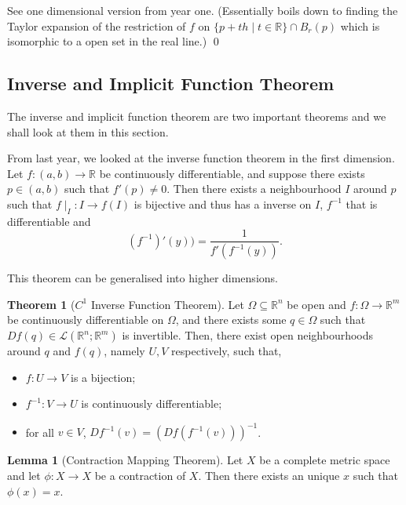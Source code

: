 \documentclass[
]{article}
\theoremstyle{definition}
\newtheorem{theorem}{Theorem}
\theoremstyle{definition}
\newtheorem{lemma}{Lemma}[section]
\begin{document}
See one dimensional version from year one. (Essentially boils down to
finding the Taylor expansion of the restriction of \(f\) on
\(\{p + th \mid t \in \mathbb{R}\} \cap B_r(p)\) which is isomorphic to
a open set in the real line.) \qed

\hypertarget{inverse-and-implicit-function-theorem}{%
\subsection{Inverse and Implicit Function
Theorem}\label{inverse-and-implicit-function-theorem}}

The inverse and implicit function theorem are two important theorems and
we shall look at them in this section.

From last year, we looked at the inverse function theorem in the first
dimension. Let \(f : (a, b) \to \mathbb{R}\) be continuously
differentiable, and suppose there exists \(p \in (a, b)\) such that
\(f'(p) \neq 0\). Then there exists a neighbourhood \(I\) around \(p\)
such that \(f \mid_I : I \to f(I)\) is bijective and thus has a inverse
on \(I\), \(f^{-1}\) that is differentiable and
\[(f^{-1})'(y)) = \frac{1}{f'(f^{-1}(y))}.\]

This theorem can be generalised into higher dimensions.

\begin{theorem}[\(C^1\) Inverse Function Theorem]
  Let \(\Omega \subseteq \mathbb{R}^n\) be open and \(f : \Omega \to \mathbb{R}^m\) 
  be continuously differentiable on \(\Omega\), and there exists some \(q \in \Omega\) 
  such that \(Df(q) \in \mathcal{L}(\mathbb{R}^n; \mathbb{R}^m)\) is invertible.
  Then, there exist open neighbourhoods around \(q\) and \(f(q)\), namely \(U, V\)
  respectively, such that,
  \begin{itemize}
    \item \(f : U \to V\) is a bijection;
    \item \(f^{-1} : V \to U\) is continuously differentiable;
    \item for all \(v \in V\), \(Df^{-1}(v) = (Df(f^{-1}(v)))^{-1}\).
  \end{itemize}
\end{theorem}

\begin{lemma}[Contraction Mapping Theorem]
  Let \(X\) be a complete metric space and let \(\phi : X \to X\) be a contraction 
  of \(X\). Then there exists an unique \(x\) such that \(\phi(x) = x\).
\end{lemma}
\end{document}
